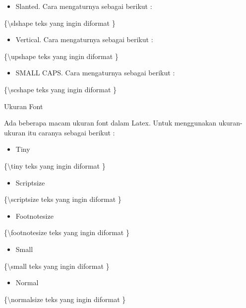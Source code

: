 \begin{itemize}
\item Slanted. Cara mengaturnya sebagai berikut :
\end{itemize}
\hspace{0,5in}\{$\setminus$slshape teks yang ingin diformat \}

\begin{itemize}
\item Vertical. Cara mengaturnya sebagai berikut :
\end{itemize}
\hspace{0,5in}\{$\setminus$upshape teks yang ingin diformat \}

\begin{itemize}
\item SMALL CAPS. Cara mengaturnya sebagai berikut :
\end{itemize}
\hspace{0,5in}\{$\setminus$scshape teks yang ingin diformat \}
\par \vspace{12pt}


Ukuran Font

Ada beberapa macam ukuran font dalam Latex. Untuk menggunakan 
ukuran-ukuran itu caranya sebagai berikut :

\begin{itemize}
\item Tiny
\end{itemize}
\hspace{0,5in}\{$\setminus$tiny teks yang ingin diformat \}

\begin{itemize}
\item Scriptsize
\end{itemize}
\hspace{0,5in}\{$\setminus$scriptsize teks yang ingin diformat \}

\begin{itemize}
\item Footnotesize
\end{itemize}
\hspace{0,5in}\{$\setminus$footnotesize teks yang ingin diformat \}

\begin{itemize}
\item Small
\end{itemize}
\hspace{0,5in}\{$\setminus$small teks yang ingin diformat \}

\begin{itemize}
\item Normal
\end{itemize}
\hspace{0,5in}\{$\setminus$normalsize teks yang ingin diformat \}


